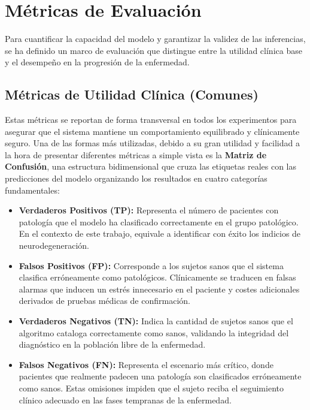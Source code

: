 \documentclass[12pt, oneside, english, spanish]{book}
\begin{document}
\section{Métricas de Evaluación} \label{sec:metricas}

Para cuantificar la capacidad del modelo y garantizar la validez de las inferencias, se ha definido un marco de evaluación que distingue entre la utilidad clínica base y el desempeño en la progresión de la enfermedad.

\subsection{Métricas de Utilidad Clínica (Comunes)} \label{subsec:metricas_comunes}

Estas métricas se reportan de forma transversal en todos los experimentos para asegurar que el sistema mantiene un comportamiento equilibrado y clínicamente seguro. Una de las formas más utilizadas, debido a su gran utilidad y facilidad a la hora de presentar diferentes métricas a simple vista es la \textbf{Matriz de Confusión}, una estructura bidimensional que cruza las etiquetas reales con las predicciones del modelo organizando los resultados en cuatro categorías fundamentales:

\begin{itemize}
	\item \textbf{Verdaderos Positivos (TP):} Representa el número de pacientes con patología que el modelo ha clasificado correctamente en el grupo patológico. En el contexto de este trabajo, equivale a identificar con éxito los indicios de neurodegeneración.
	
	\item \textbf{Falsos Positivos (FP):} Corresponde a los sujetos sanos que el sistema clasifica erróneamente como patológicos. Clínicamente se traducen en falsas alarmas que inducen un estrés innecesario en el paciente y costes adicionales derivados de pruebas médicas de confirmación.
	
	\item \textbf{Verdaderos Negativos (TN):} Indica la cantidad de sujetos sanos que el algoritmo cataloga correctamente como sanos, validando la integridad del diagnóstico en la población libre de la enfermedad.
	
	\item \textbf{Falsos Negativos (FN):} Representa el escenario más crítico, donde pacientes que realmente padecen una patología son clasificados erróneamente como sanos. Estas omisiones impiden que el sujeto reciba el seguimiento clínico adecuado en las fases tempranas de la enfermedad.
\end{itemize}
\end{document}
